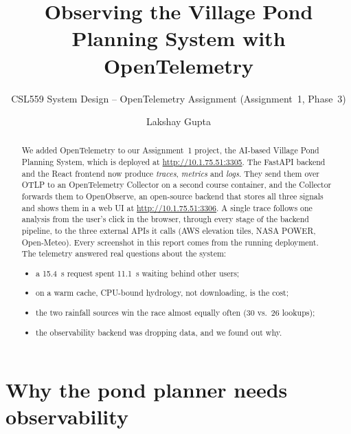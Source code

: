 \documentclass[manuscript,screen]{acmart}
\begin{document}
\sloppy

\title{Observing the Village Pond Planning System with OpenTelemetry}
\subtitle{CSL559 System Design -- OpenTelemetry Assignment (Assignment~1, Phase~3)}

\author{Lakshay Gupta}
\affiliation{}
\authorsaddresses{}

\renewcommand{\shortauthors}{Lakshay Gupta}

\begin{abstract}
We added OpenTelemetry to our Assignment~1 project, the AI-based Village
Pond Planning System, which is deployed at \url{http://10.1.75.51:3305}.
The FastAPI backend and the React frontend now produce
\emph{traces}, \emph{metrics} and \emph{logs}. They send them over OTLP
to an OpenTelemetry Collector on a second course container, and the
Collector forwards them to OpenObserve, an open-source backend that stores
all three signals and shows them in a web UI at \url{http://10.1.75.51:3306}.
A single trace follows one analysis from the user's click in the browser,
through every stage of the backend pipeline, to the three external APIs it
calls (AWS elevation tiles, NASA POWER, Open-Meteo). Every screenshot in
this report comes from the running deployment. The telemetry answered real
questions about the system:
\begin{itemize}
\item a 15.4~s request spent 11.1~s waiting behind other users;
\item on a warm cache, CPU-bound hydrology, not downloading, is the cost;
\item the two rainfall sources win the race almost equally often (30 vs.\ 26 lookups);
\item the observability backend was dropping data, and we found out why.
\end{itemize}
\end{abstract}


\maketitle

\section{Why the pond planner needs observability}
\label{sec:why}
\end{document}
